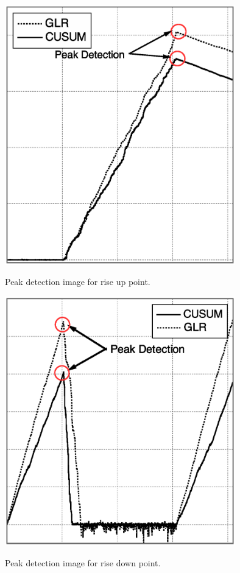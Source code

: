 \begin{center}
  \begin{figure}[t]
    \centering
    \includegraphics[width=100mm]{peak_OFF2ON.eps}
    \label{peak_OFF2ON}
    \caption{Peak detection image for rise up point.}
  \end{figure}
\end{center} 

\begin{center}
  \begin{figure}[t]
    \centering
    \includegraphics[width=100mm]{peak_ON2OFF.eps}
    \label{peak_ON2OFF}
    \caption{Peak detection image for rise down point.}
  \end{figure}
\end{center} 
